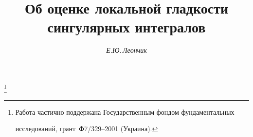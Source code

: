




%


\newcommand{\ctg}{\operatorname{ctg}}


\newcommand{\N}{\cal N}


\newcommand{\Esssup}{\operatornamewithlimits{ess\; sup}}


\newcommand{\tts}[1]{}









\setcounter{page}{20}

















\author{\it Е.Ю.\,Леончик}




\title{Об оценке локальной гладкости\\ сингулярных интегралов}


\thanks{Работа частично поддержана Государственным фондом фундаментальных


исследований, грант \No\,Ф7/329--2001 (Украина).}





\date{}




\pagestyle{plain} %








